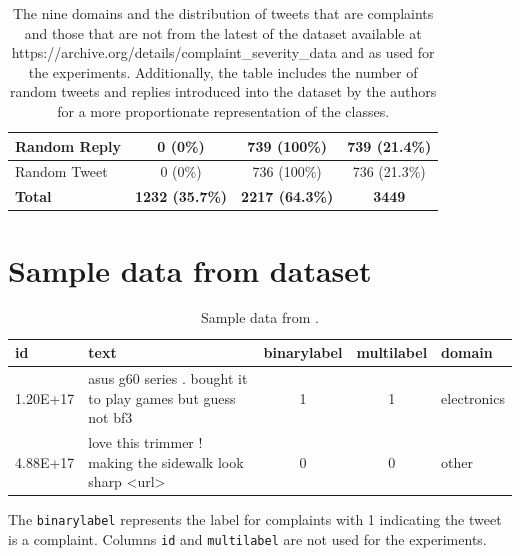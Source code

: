 \begin{table}[ht]
\begin{tabularx}{\textwidth}{|X|c|c|c|}
        \hline
        \hline
        Random Reply                & 0 \small{(0\%)}                & 739 \small{(100\%)}            & 739 \small{(21.4\%)}  \\
        \hline
        Random Tweet                & 0 \small{(0\%)}                & 736 \small{(100\%)}            & 736 \small{(21.3\%)}  \\
        \hline
        \hline
        \rowcolor[gray]{0.9}
        \textbf{Total}              & \textbf{1232 \small{(35.7\%)}} & \textbf{2217 \small{(64.3\%)}} & \textbf{3449}         \\
        \hline
    \end{tabularx}
    \caption{The nine domains and the distribution of tweets that are complaints and those that are not from the latest of the dataset available at https://archive.org/details/complaint\_severity\_data and as used for the experiments. Additionally, the table includes the number of random tweets and replies introduced into the dataset by the authors for a more proportionate representation of the classes.}
    \label{tab: fulldataset_breakdown}
\end{table}

\section{Sample data from dataset}
\begin{table}[ht]
    \captionsetup{font=small}
    \small
    \centering
    \begin{tabularx}{\textwidth}{|l|X|c|c|l|}
        \hline
        \rowcolor[gray]{0.7}
        \textbf{id} & \textbf{text}                                               & \textbf{binarylabel} & \textbf{multilabel} & \textbf{domain} \\
        \hline
        1.20E+17    & asus g60 series . bought it to play games but guess not bf3 & 1                    & 1                   & electronics     \\
        \hline
        4.88E+17    & love this trimmer ! making the sidewalk look sharp <url>    & 0                    & 0                   & other           \\
        \hline
    \end{tabularx}
    \caption{Sample data from \cite{jinModelingSeverityComplaints2021}.}
    \label{tab: apdx_sample_data}
\end{table}

The \texttt{binarylabel} represents the label for complaints with 1 indicating the tweet is a complaint. Columns \texttt{id} and \texttt{multilabel} are not used for the experiments.



